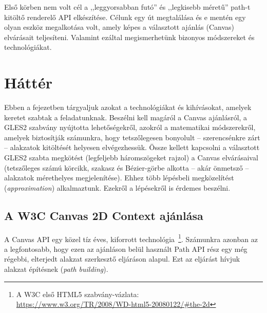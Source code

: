 \documentclass[12pt]{report}
\theoremstyle{definition}
\newcommand{\angol}[1]{\textsl{#1}}
\begin{document}
  Első körben nem volt cél a ,,leggyorsabban futó'' és ,,legkisebb
méretű'' path-t kitöltő renderelő API elkészítése. Célunk egy út
megtalálása és e mentén egy olyan eszköz megalkotása volt, amely képes
a választott ajánlás (Canvas) elvárásait teljesíteni. Valamint ezáltal
megismerhetünk bizonyos módszereket és technológiákat.



    \chapter{Háttér}
    \label{Háttér}

  Ebben a fejezetben tárgyaljuk azokat a technológiákat és kihívásokat,
amelyek keretet szabtak a feladatunknak. Beszélni kell magáról a Canvas
ajánlásról, a GLES2 szabvány nyújtotta lehetőségekről, azokról a
matematikai módszerekről, amelyek biztosítják számunkra, hogy
tetszőlegesen bonyolult -- szerencsénkre zárt -- alakzatok kitöltését
helyesen elvégezhessük. Össze kellett kapcsolni a választott GLES2
szabta megkötést (legfeljebb háromszögeket rajzol) a Canvas
elvárásaival (tetszőleges számú körcikk, szakasz és Bézier-görbe
alkotta -- akár önmetsző -- alakzatok mérethelyes megjelenítése). Ehhez
több lépésbeli megközelítést (\angol{approximation}) alkalmaztunk.
Ezekről a lépésekről is érdemes beszélni.

    \section[A Canvas ajánlás]{A W3C Canvas 2D Context ajánlása}
    \label{A Canvas ajánlás}

  A Canvas API egy közel tíz éves, kiforrott technológia~\footnote{A W3C
első HTML5 szabvány-vázlata:\\
\footnotesize{\url{https://www.w3.org/TR/2008/WD-html5-20080122/\#the-2d}}}.
Számunkra azonban az a legfontosabb, hogy ezen az ajánláson belül
használt Path API rész egy még régebbi, elterjedt alakzat szerkesztő
eljáráson alapul. Ezt az eljárást hívjuk alakzat építésnek
(\angol{path building}).


\end{document}
